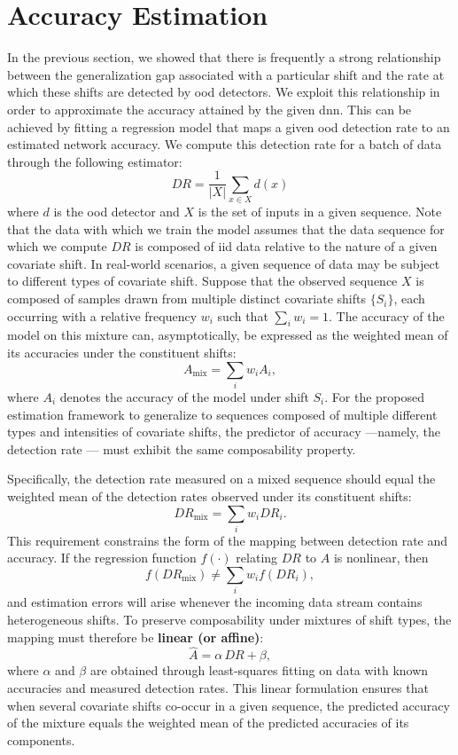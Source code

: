 \section{Accuracy Estimation}
In the previous section, we showed that there is frequently a strong relationship between the generalization gap associated with a particular shift and the rate at which these shifts are detected by \gls{ood} detectors. We exploit this relationship in order to approximate the accuracy attained by the given \gls{dnn}. This can be achieved by fitting a regression model that maps a given \gls{ood} detection rate to an estimated network accuracy. We compute this detection rate for a batch of data through the following estimator:
\begin{equation}
    DR = \frac{1}{|X|} \sum_{x \in X} d(x)
\end{equation}
where \(d\) is the \gls{ood} detector and \(X\) is the set of inputs in a given sequence. Note that the data with which we train the model assumes that the data sequence for which we compute \(DR\) is composed of \gls{iid} data relative to the nature of a given covariate shift. In real-world scenarios, a given sequence of data may be subject to different types of covariate shift. Suppose that the observed sequence \(X\) is composed of samples drawn from multiple distinct covariate shifts \(\{S_i\}\), each occurring with a relative frequency \(w_i\) such that \(\sum_i w_i = 1\). The accuracy of the model on this mixture can, asymptotically, be expressed as the weighted mean of its accuracies under the constituent shifts:
\begin{equation}
    A_{\text{mix}} = \sum_i w_i A_i,
\end{equation}
where \(A_i\) denotes the accuracy of the model under shift \(S_i\). For the proposed estimation framework to generalize to sequences composed of multiple different types and intensities of covariate shifts, the predictor of accuracy ---namely, the detection rate --- must exhibit the same composability property. 


Specifically, the detection rate measured on a mixed sequence should equal the weighted mean of the detection rates observed under its constituent shifts:
\begin{equation}
    DR_{\text{mix}} = \sum_i w_i DR_i.
\end{equation}
This requirement constrains the form of the mapping between detection rate and accuracy. If the regression function \(f(\cdot)\) relating \(DR\) to \(A\) is nonlinear, then
\[
f(DR_{\text{mix}}) \neq \sum_i w_i f(DR_i),
\]
and estimation errors will arise whenever the incoming data stream contains heterogeneous shifts. To preserve composability under mixtures of shift types, the mapping must therefore be \textbf{linear (or affine)}:
\begin{equation}
    \hat{A} = \alpha \, DR + \beta,
\end{equation}
where \(\alpha\) and \(\beta\) are obtained through least-squares fitting on data with known accuracies and measured detection rates. This linear formulation ensures that when several covariate shifts co-occur in a given sequence, the predicted accuracy of the mixture equals the weighted mean of the predicted accuracies of its components. 
